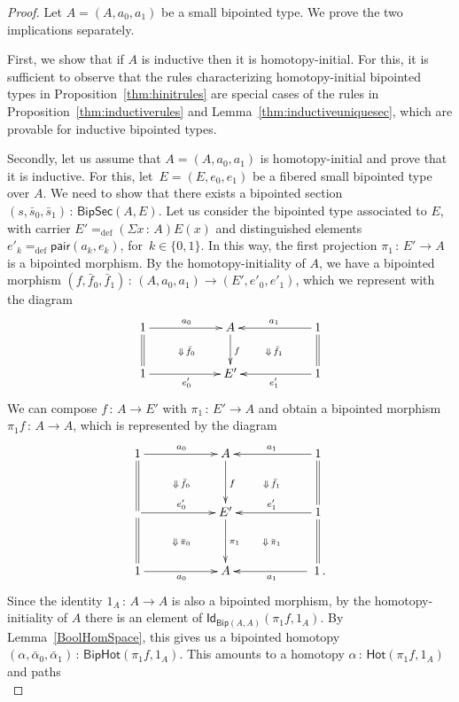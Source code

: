 \documentclass[10pt,a4paper,oneside,reqno]{amsart}
\numberwithin{equation}{section}
\theoremstyle{mythm}
\theoremstyle{mydef}
\theoremstyle{myrmk}
\newcommand{\defeq}{=_{\mathrm{def}}}
\newcommand{\co}{\,{:}\,}
\newcommand{\Hot}{\mathsf{Hot}}
\newcommand{\Id}{\mathsf{Id}}
\newcommand{\pair}{\mathsf{pair}}
\newcommand{\Bip}{\mathsf{Bip}}
\newcommand{\BipHot}{\mathsf{BipHot}}
\newcommand{\BipSec}{\mathsf{BipSec}}
\begin{document}
\begin{proof} Let $A = (A, a_0, a_1)$ be a small bipointed type. We prove the two 
implications separately. 

First, we show that if $A$ is inductive then
it is homotopy-initial. For this, it is sufficient to 
observe that the rules characterizing homotopy-initial bipointed types in Proposition~\ref{thm:hinitrules}
are special cases of the rules in Proposition~\ref{thm:inductiverules} and Lemma~\ref{thm:inductiveuniquesec},
which are provable for inductive bipointed types. 

Secondly, let us assume that $A = (A, a_0, a_1)$ is homotopy-initial and prove that it is inductive. 
For this, let~$E = (E, e_0, e_1)$ be a fibered small bipointed type over $A$. We need to show that there
exists a bipointed section $(s, \bar{s}_0, \bar{s}_1) \co \BipSec(A,E)$.
Let us consider the bipointed type associated to $E$, with carrier 
$E' \defeq (\Sigma x \co A) E(x)$ 
and distinguished elements  $e'_k \defeq \pair(a_k, e_k)$, 
for~$k \in \{ 0, 1 \}$. In this way,  the first projection $\pi_1 \co 
E' \to A$ is a bipointed morphism. By the homotopy-initiality of $A$, we have a bipointed morphism 
$(f, \bar{f}_0, \bar{f}_1) \co (A, a_0, a_1)  \to (E', e'_0, e'_1)$, 
which we represent with the diagram
\[
\xymatrix@C=2cm{
1 \ar[r]^{a_0} \ar@{=}[d] \ar@{}[dr]|{\Downarrow \, \bar{f}_0} & A  \ar[d]^f & 1 \ar[l]_{a_1} \ar@{=}[d]
 \ar@{}[dl]|{\Downarrow \, \bar{f}_1}   \\
1 \ar[r]_{e'_0}  & E' & 1 \ar[l]^{e'_1} }
 \]
 We can compose $f \co A \to E'$ with $\pi_1 \co E' \to A$ and obtain a bipointed morphism $\pi_1  f \co A \to A$, which is represented by the diagram
  \[
\xymatrix@C=2cm@R=1.2cm{
1  \ar[r]^{a_0} \ar@{=}[d]  \ar@{}[dr]|{\Downarrow \, \bar{f}_0}  & A  \ar[d]^f & 1 \ar[l]_{a_1}  \ar@{=}[d]  
 \ar@{}[dl]|{\Downarrow \, \bar{f}_1} \\
\ar[r]^{e'_0} \ar@{=}[d]   \ar@{}[dr]|{\Downarrow \, \bar{\pi}_0}  & E' \ar[d]^{\pi_1}  & 1 \ar[l]_{e'_1} \ar@{=}[d] 
 \ar@{}[dl]|{\Downarrow \, \bar{\pi}_1}  \\
1 \ar[r]_{a_0} & A &  \; 1  \, . \ar[l]^{a_1}}
 \]
Since the identity $1_A \co A \to A$ is also a bipointed morphism, by the homotopy-initiality of $A$ there is an element of $\Id_{\Bip(A,A)}(\pi_1  f, 1_A)$. 
 By Lemma~\ref{BoolHomSpace}, this gives us a bipointed homotopy $(\alpha,
\bar{\alpha}_0,\bar{\alpha}_1) \co \BipHot( \pi_1  f , 1_A)$. This amounts to a homotopy $\alpha \co \Hot(\pi_1 
 f, 1_A)$ and paths
\begin{equation*}

\end{equation*}
\end{proof}
\end{document}

